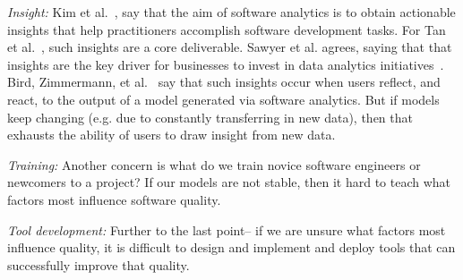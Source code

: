 \item {\em Insight:}
Kim et al.~\cite{Kim2016},
 say  that the aim of software analytics is to
        obtain actionable   insights
       that
        help practitioners accomplish   software development tasks.
 For Tan et al.~\cite{tan2016defining}, 
        such   insights  are a core deliverable. 
        Sawyer et al. agrees, saying that  that  insights are the key driver for businesses 
        to invest in data analytics initiatives~\cite{sawyer2013bi}.  
           Bird, Zimmermann, et al.~\cite{Bird:2015} say that such  insights occur when
        users reflect, and react, to the output of a model generated
        via software analytics. But if  models keep changing (e.g. due to constantly transferring in new data), then that
          exhausts the ability of  users to draw insight from  new data.
          \item {\em Training:} Another concern is what do we train novice software engineers
          or newcomers to a project?  
          If our models are not stable, then it hard to teach
          what factors  most influence software quality.
          \item {\em Tool development:} Further to the last point-- if we are unsure what 
          factors most influence quality, it is difficult to design and implement and deploy tools
          that can successfully improve that quality.
\ei

